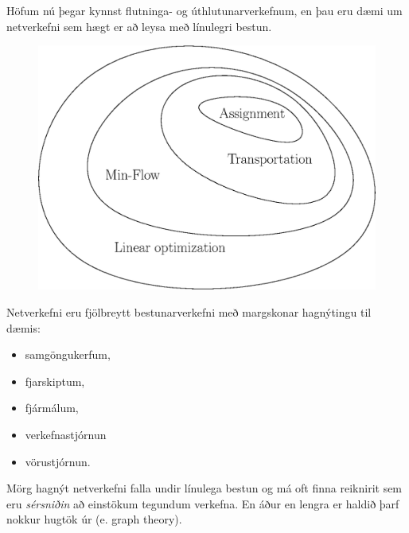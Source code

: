 Höfum nú þegar kynnst flutninga- og úthlutunarverkefnum, en þau eru dæmi um netverkefni sem hægt er að leysa með línulegri bestun.
\begin{figure}[h!]
\centering
 \includegraphics[width=0.6\columnwidth]{figs/types_of_networkproblems.eps}
\end{figure}

Netverkefni eru fjölbreytt bestunarverkefni með margskonar hag\-nýtingu til dæmis:
\begin{itemize}
 \item samgöngukerfum, 
\item fjarskiptum, 
\item fjármálum, 
\item verkefnastjórnun
\item vöru\-stjórnun.
\end{itemize}

Mörg hagnýt netverkefni falla undir línulega bestun og má oft finna reiknirit sem eru \emph{sérsniðin} að einstökum tegundum verkefna. En áður en lengra er haldið þarf nokkur hugtök úr  (e. graph theory).

